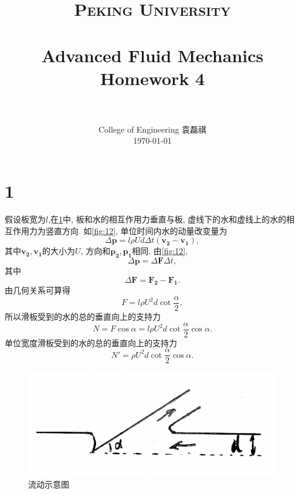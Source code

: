 \documentclass[12pt]{article}
\title{
		\vspace{-1in} 	
		\usefont{OT1}{bch}{b}{n}
		\normalfont \normalsize \textsc{\LARGE Peking University}\\[1cm] %
		\horrule{0.5pt} \\[0.5cm]
		\huge \bfseries{Advanced Fluid Mechanics Homework 4} \\
		\horrule{2pt} \\[0.5cm]
}
\author{
		\normalfont 								\normalsize
		College of Engineering \quad 2001111690  \quad 袁磊祺\\	\normalsize
        \today
}
\date{}
\begin{document}


\maketitle

\section{1}

假设板宽为$l$,在\cref{fig:11}中, 板和水的相互作用力垂直与板, 虚线下的水和虚线上的水的相互作用力为竖直方向. 如\cref{fig:12}, 单位时间内水的动量改变量为
\begin{equation}
	\Delta \bm{p} = l\rho U d \Delta t (\bm{v_2}-\bm{v_1}),
\end{equation}
其中$\bm{v_2},\bm{v_1}$的大小为$U$, 方向和$\bm{p_2},\bm{p_1}$相同. 
由\cref{fig:12},
\begin{equation}
	\Delta \bm{p} = \Delta \bm{F}  \Delta t,
\end{equation}
其中
\begin{equation}
	\Delta \bm{F} = \bm{F_2} - \bm{F_1}.
\end{equation}
由几何关系可算得
\begin{equation}
	F = l\rho U^2 d \cot \frac{\alpha}{2},
\end{equation}
所以滑板受到的水的总的垂直向上的支持力
\begin{equation}
	N = F \cos \alpha = l\rho U^2 d \cot \frac{\alpha}{2} \cos \alpha.
\end{equation}
单位宽度滑板受到的水的总的垂直向上的支持力
\begin{equation}
	N' = \rho U^2 d \cot \frac{\alpha}{2} \cos \alpha.
\end{equation}

\begin{figure}[htp]
	\centering
	\includegraphics[width=12cm]{11.png}
	\caption{流动示意图}
	\label{fig:11}
\end{figure}
\end{document}
